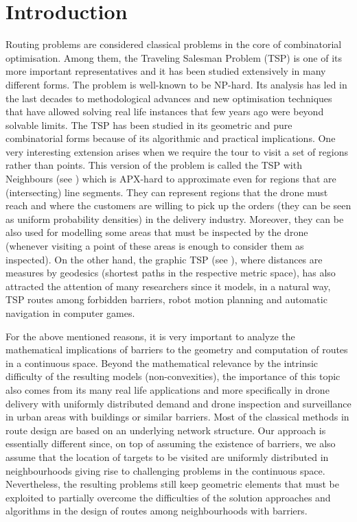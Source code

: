 \documentclass[a4paper,  review, authoryear, 1p.]{elsarticle}
\begin{document}
		\section{Introduction}
		Routing problems are considered classical problems in the core of combinatorial optimisation. Among them, the Traveling Salesman Problem (TSP) is one of its more important representatives and it has been studied extensively in many different forms. The problem is well-known to be NP-hard. Its analysis has led in the last decades  to methodological advances and new optimisation techniques that have allowed solving real life instances that few years ago were beyond solvable limits. The TSP has been studied in its geometric and pure combinatorial forms because of its algorithmic and practical implications. One very interesting extension arises when we require the tour to visit a set of regions rather than points. This version of the problem is called the TSP with Neighbours (see  \citet{arkin_approximation_1994}) which is APX-hard to approximate even for regions that are (intersecting) line segments.  They can represent regions that the drone must reach and where the customers are willing to pick up the orders (they can be seen as uniform probability densities) in the delivery industry. Moreover, they can be also used for modelling some areas that must be inspected by the drone (whenever visiting a point of these areas is enough to consider them as inspected).  On the other hand, the graphic TSP (see \citet{moemke_approximating_2011}), where distances are measures by geodesics (shortest paths in the respective metric space), has also attracted the attention of many researchers since it models, in a natural way, TSP routes among forbidden barriers, robot motion planning and automatic navigation in computer games. 
		
		For the above mentioned reasons, it is very important to analyze the mathematical implications of barriers to the geometry and computation of routes in a continuous space. Beyond the mathematical relevance by the intrinsic difficulty of the resulting models (non-convexities), the importance of this topic also comes from its many real life applications and more specifically in drone delivery with uniformly distributed demand and drone inspection and surveillance in urban areas with buildings or similar barriers.  Most of the classical methods in route design are based on an underlying network structure. Our approach is essentially different since, on top of assuming the existence of barriers, we also assume that the location of targets to be visited are uniformly distributed in neighbourhoods giving rise to challenging  problems in the continuous space. Nevertheless, the resulting problems still keep geometric elements that must be exploited to partially overcome the difficulties of the solution approaches and algorithms in the design of routes among neighbourhoods with barriers.
		
\end{document}
